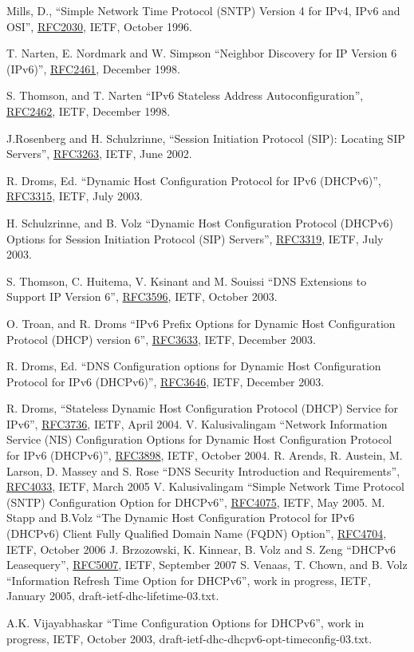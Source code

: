 \newpage

\newcommand{\rfc}[1]{\href{http://tools.ietf.org/html/rfc#1}{RFC#1}}
\begin{thebibliography}{1}

 Mills, D., ``Simple Network Time Protocol (SNTP) Version 4 for
        IPv4, IPv6 and OSI'', \rfc{2030}, IETF, October 1996.

 T. Narten, E. Nordmark and W. Simpson ``Neighbor
	Discovery for IP Version 6 (IPv6)'', \rfc{2461}, December 1998.

 S. Thomson, and T. Narten ``IPv6 Stateless Address
  Autoconfiguration'', \rfc{2462}, IETF, December 1998.

 J.Rosenberg and H. Schulzrinne, ``Session Initiation Protocol
       (SIP): Locating SIP Servers'', \rfc{3263}, IETF, June 2002.

 R. Droms, Ed. ``Dynamic Host Configuration Protocol
  for IPv6 (DHCPv6)'', \rfc{3315}, IETF, July 2003.

 H. Schulzrinne, and B. Volz ``Dynamic Host
  Configuration Protocol (DHCPv6) Options for Session Initiation
  Protocol (SIP) Servers'', \rfc{3319}, IETF, July 2003.

 S. Thomson, C. Huitema, V. Ksinant and M. Souissi
  ``DNS Extensions to Support IP Version 6'', \rfc{3596}, IETF, October
  2003.

 O. Troan, and R. Droms ``IPv6 Prefix Options for
  Dynamic Host Configuration Protocol (DHCP) version 6'', \rfc{3633},
  IETF, December 2003.

 R. Droms, Ed. ``DNS Configuration options for
  Dynamic Host Configuration Protocol for IPv6 (DHCPv6)'', \rfc{3646},
  IETF, December 2003.

 R. Droms, ``Stateless Dynamic Host Configuration
  Protocol (DHCP) Service for IPv6'', \rfc{3736}, IETF, April 2004.
 V. Kalusivalingam ``Network Information Service
  (NIS) Configuration Options for Dynamic Host Configuration Protocol
  for IPv6 (DHCPv6)'', \rfc{3898}, IETF, October 2004.
 R. Arends,  R. Austein, M. Larson, D. Massey and S. Rose
  ``DNS Security Introduction and Requirements'',
  \rfc{4033}, IETF, March 2005
 V. Kalusivalingam ``Simple Network Time Protocol
	(SNTP) Configuration Option for DHCPv6'', \rfc{4075}, IETF, May 2005.
 M. Stapp and  B.Volz ``The Dynamic Host
Configuration Protocol for IPv6 (DHCPv6) Client Fully Qualified Domain
Name (FQDN) Option'', \rfc{4704}, IETF, October 2006
 J. Brzozowski, K. Kinnear, B. Volz and S. Zeng
  ``DHCPv6 Leasequery'', \rfc{5007}, IETF, September 2007
 S. Venaas, T. Chown, and B. Volz
 ``Information Refresh Time Option for DHCPv6'', work in progress,
 IETF, January 2005, draft-ietf-dhc-lifetime-03.txt.

 A.K. Vijayabhaskar ``Time Configuration Options
	for DHCPv6'', work in progress, IETF, October 2003,
	draft-ietf-dhc-dhcpv6-opt-timeconfig-03.txt.

\end{thebibliography}
